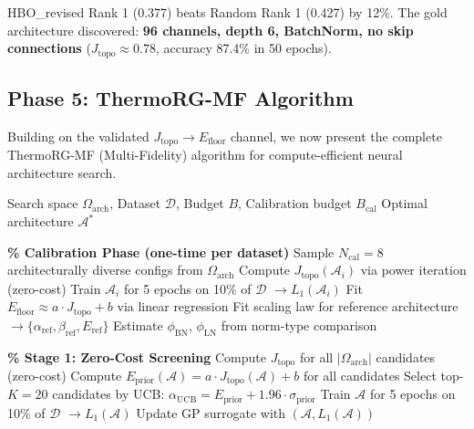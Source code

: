 \documentclass[11pt, a4paper]{article}
\theoremstyle{definition}
\begin{document}
HBO\_revised Rank 1 (0.377) beats Random Rank 1 (0.427) by 12\%. The gold architecture discovered: \textbf{96 channels, depth 6, BatchNorm, no skip connections} ($J_{\mathrm{topo}} \approx 0.78$, accuracy 87.4\% in 50 epochs).

\subsection{Phase 5: ThermoRG-MF Algorithm}
\label{sec:phase5}

Building on the validated $J_{\mathrm{topo}} \to E_{\mathrm{floor}}$ channel, we now present the complete ThermoRG-MF (Multi-Fidelity) algorithm for compute-efficient neural architecture search.

\begin{algorithm}[htbp]
\caption{ThermoRG-MF: Multi-Fidelity Architecture Search}
\label{alg:thermorg-mf}
\begin{algorithmic}[1]
\REQUIRE Search space $\Omega_{\mathrm{arch}}$, Dataset $\mathcal{D}$, Budget $B$, Calibration budget $B_{\mathrm{cal}}$
\ENSURE Optimal architecture $\mathcal{A}^*$

\STATE \textbf{\% Calibration Phase (one-time per dataset)}
\STATE Sample $N_{\mathrm{cal}} = 8$ architecturally diverse configs from $\Omega_{\mathrm{arch}}$
    \STATE Compute $J_{\mathrm{topo}}(\mathcal{A}_i)$ via power iteration (zero-cost)
    \STATE Train $\mathcal{A}_i$ for 5 epochs on 10\% of $\mathcal{D}$ $\rightarrow L_1(\mathcal{A}_i)$
\ENDFOR
\STATE Fit $E_{\mathrm{floor}} \approx a \cdot J_{\mathrm{topo}} + b$ via linear regression
\STATE Fit scaling law for reference architecture $\rightarrow \{\alpha_{\mathrm{ref}}, \beta_{\mathrm{ref}}, E_{\mathrm{ref}}\}$
\STATE Estimate $\phi_{\mathrm{BN}}$, $\phi_{\mathrm{LN}}$ from norm-type comparison

\STATE \textbf{\% Stage 1: Zero-Cost Screening}
\STATE Compute $J_{\mathrm{topo}}$ for all $|\Omega_{\mathrm{arch}}|$ candidates (zero-cost)
\STATE Compute $E_{\mathrm{prior}}(\mathcal{A}) = a \cdot J_{\mathrm{topo}}(\mathcal{A}) + b$ for all candidates
\STATE Select top-$K = 20$ candidates by UCB: $\alpha_{\mathrm{UCB}} = E_{\mathrm{prior}} + 1.96 \cdot \sigma_{\mathrm{prior}}$
    \STATE Train $\mathcal{A}$ for 5 epochs on 10\% of $\mathcal{D}$ $\rightarrow L_1(\mathcal{A})$
    \STATE Update GP surrogate with $(\mathcal{A}, L_1(\mathcal{A}))$
\ENDFOR


\end{algorithmic}
\end{algorithm}
\end{document}
